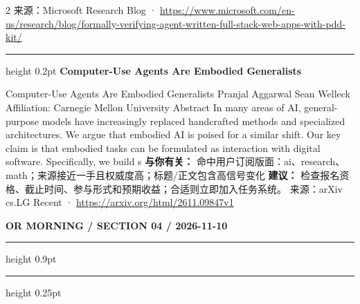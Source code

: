 \documentclass[10.5pt]{ctexart}
\begin{document}
\begin{multicols}{2}
{\footnotesize\color{ormuted} 来源：Microsoft Research Blog · \url{https://www.microsoft.com/en-us/research/blog/formally-verifying-agent-written-full-stack-web-apps-with-pdd-kit/}}
\vspace{2mm}
\hrule height 0.2pt
\vspace{2mm}
{\large\bfseries Computer-Use Agents Are Embodied Generalists}\par
Computer-Use Agents Are Embodied Generalists Pranjal Aggarwal Sean Welleck Affiliation: Carnegie Mellon University Abstract In many areas of AI, general-purpose models have increasingly replaced handcrafted methods and specialized architectures. We argue that embodied AI is poised for a similar shift. Our key claim is that embodied tasks can be formulated as interaction with digital software. Specifically, we build s
\textbf{与你有关：} 命中用户订阅版面：ai、research、math；来源接近一手且权威度高；标题/正文包含高信号变化
\textbf{建议：} 检查报名资格、截止时间、参与形式和预期收益；合适则立即加入任务系统。
{\footnotesize\color{ormuted} 来源：arXiv cs.LG Recent · \url{https://arxiv.org/html/2611.09847v1}}
\end{multicols}
\newpage
{\small\bfseries OR MORNING / SECTION 04 / 2026-11-10}
\vspace{2mm}
\hrule height 0.9pt
\vspace{1.5mm}
\hrule height 0.25pt
\vspace{4mm}
\end{document}
